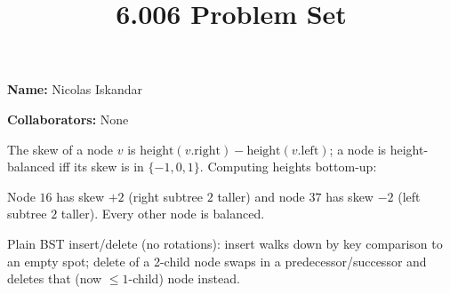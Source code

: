 \documentclass[12pt,twoside]{article}
\title{6.006 Problem Set \theproblemsetnum}
\newcommand{\theproblemsetnum}{4}
\begin{document}
\handout{Problem Set \theproblemsetnum}

\setlength{\parindent}{0pt}
\medskip\hrulefill\medskip

{\bf Name:} Nicolas Iskandar

\medskip

{\bf Collaborators:} None

\medskip\hrulefill

\begin{problems}

\problem  %

\begin{problemparts}

\problempart %
The skew of a node $v$ is $\mathrm{height}(v.\mathrm{right}) -
\mathrm{height}(v.\mathrm{left})$; a node is height-balanced iff its
skew is in $\{-1,0,1\}$. Computing heights bottom-up:

\begin{center}
\end{center}

Node $16$ has skew $+2$ (right subtree $2$ taller) and node $37$ has
skew $-2$ (left subtree $2$ taller). Every other node is balanced.

\problempart %
Plain BST insert/delete (no rotations): insert walks down by key
comparison to an empty spot; delete of a 2-child node swaps in a
predecessor/successor and deletes that (now $\le 1$-child) node
instead.


\end{problemparts}
\end{problems}
\end{document}

